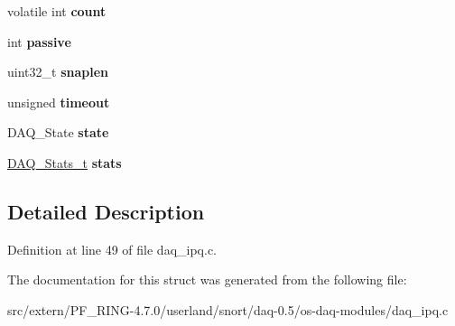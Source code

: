 \begin{DoxyCompactItemize}
\item 
\hypertarget{struct_ipq_impl_a1e8f2eba298764ea79dce5e9a6fdf832}{
volatile int {\bfseries count}}
\label{struct_ipq_impl_a1e8f2eba298764ea79dce5e9a6fdf832}

\item 
\hypertarget{struct_ipq_impl_ae9fc334875e75b6b4f246d6fe98740fb}{
int {\bfseries passive}}
\label{struct_ipq_impl_ae9fc334875e75b6b4f246d6fe98740fb}

\item 
\hypertarget{struct_ipq_impl_a9cdf6f8a6eb2375672423613018bfb68}{
uint32\_\-t {\bfseries snaplen}}
\label{struct_ipq_impl_a9cdf6f8a6eb2375672423613018bfb68}

\item 
\hypertarget{struct_ipq_impl_aa6aaf8b865a62a8e3f45dbfece9cf169}{
unsigned {\bfseries timeout}}
\label{struct_ipq_impl_aa6aaf8b865a62a8e3f45dbfece9cf169}

\item 
\hypertarget{struct_ipq_impl_a89a37e17230df97b2a774c2ea3690cb9}{
DAQ\_\-State {\bfseries state}}
\label{struct_ipq_impl_a89a37e17230df97b2a774c2ea3690cb9}

\item 
\hypertarget{struct_ipq_impl_a98475be99d8b882c259a2b68e0f9dc26}{
\hyperlink{struct__daq__stats}{DAQ\_\-Stats\_\-t} {\bfseries stats}}
\label{struct_ipq_impl_a98475be99d8b882c259a2b68e0f9dc26}

\end{DoxyCompactItemize}


\subsection{Detailed Description}


Definition at line 49 of file daq\_\-ipq.c.



The documentation for this struct was generated from the following file:\begin{DoxyCompactItemize}
\item 
src/extern/PF\_\-RING-\/4.7.0/userland/snort/daq-\/0.5/os-\/daq-\/modules/daq\_\-ipq.c\end{DoxyCompactItemize}
